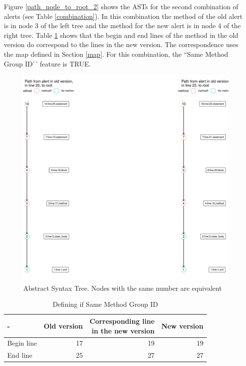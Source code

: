 \documentclass[
]{article}
\begin{document}
\normalsize

Figure \ref{path_node_to_root_2} shows the ASTs for the second
combination of alerts (see Table \ref{combination}). In this combination
the method of the old alert is in node 3 of the left tree and the method
for the new alert is in node 4 of the right tree. Table
\ref{tab_same_method_2} shows that the begin and end lines of the method
in the old version do correspond to the lines in the new version. The
correspondence uses the map defined in Section \ref{map}. For this
combination, the ``Same Method Group ID'\,' feature is TRUE.

\begin{figure}[H]
\includegraphics[width=1\linewidth]{report_files/figure-latex/unnamed-chunk-10-1} \caption{Abstract Syntax Tree. Nodes with the same number are equivalent \label{path_node_to_root_2}}\label{fig:unnamed-chunk-10}
\end{figure}

\begin{table}[H]
\caption{\label{tab:unnamed-chunk-11}Defining if Same Method Group ID \label{tab_same_method_2}}
\centering
\begin{tabular}[t]{l|r|r|r}
\hline
- & Old version & \makecell[l]{Corresponding line\\in the new version} & New version\\
\hline
Begin line & 17 & 19 & 19\\
\hline
End line & 25 & 27 & 27\\
\hline
\end{tabular}
\end{table}
\end{document}
